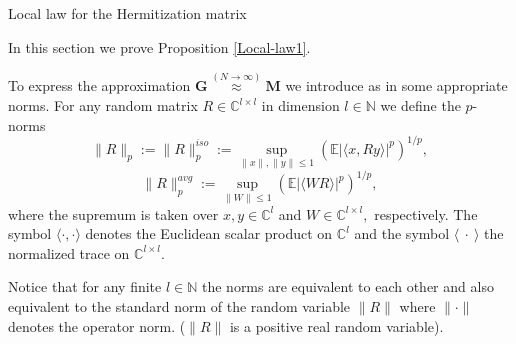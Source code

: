 \documentclass[11pt, a4paper, oneside]{book}
\numberwithin{equation}{chapter}
\newcommand{\beq}{\begin{equation}}
\newcommand{\eeq}{\end{equation}}
\begin{document}
\begin{section}{Local law for the Hermitization matrix} \label{Local}

In this section we prove Proposition \ref{Local-law1}.

To express the approximation $\mathbf{G} \stackrel{(N \to \infty)}{\approx} \mathbf{M}$ we introduce as in \cite{alt2022local} some appropriate norms. For any random matrix $R\in \mathbb{C}^{l \times l}$ in dimension $l \in \mathbb{N}$ we define the $p$-norms
%
$$ \|R\|_p:=\|R\|_p^{iso} := \sup \limits_{\|x\|,\|y\|\leq 1} ( \mathbb{E} | \langle x, Ry \rangle|^p )^{1/p} , $$
%
\beq \label{norms}
\|R\|_p^{avg} := \sup \limits_{\|W\|\leq 1} ( \mathbb{E} | \langle WR \rangle |^p)^{1/p}, \eeq
%
where the supremum is taken over $x,y \in \mathbb{C}^l$ and $W \in \mathbb{C}^{l \times l},$ respectively. The symbol $\langle \cdot , \cdot  \rangle$ denotes the Euclidean scalar product on $\mathbb{C}^l$ and the symbol $\langle \ \cdot \  \rangle$ the normalized trace on $\mathbb{C}^{l \times l}.$

Notice that for any finite $l\in \mathbb{N}$ the norms are equivalent to each other and also equivalent to the standard norm of the random variable $\|R\|$ where $\|\cdot\|$ denotes the operator norm. ($\|R\|$ is a positive real random variable).


\end{section}
\end{document}
